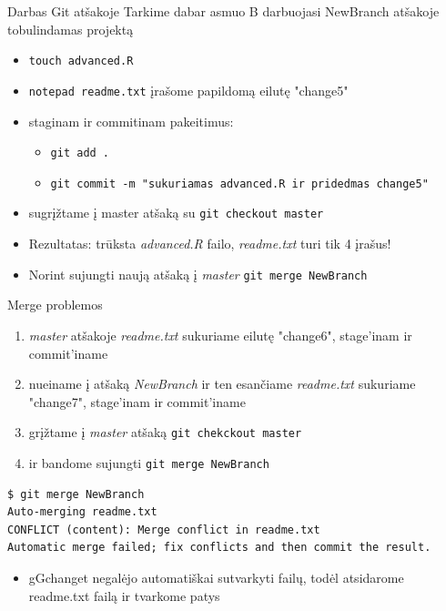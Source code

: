 \documentclass[11pt,xcolor=table]{beamer}
\begin{document}
\begin{frame}{Darbas Git atšakoje}
Tarkime dabar asmuo B darbuojasi NewBranch atšakoje tobulindamas projektą
\begin{itemize}
\item \colorbox{listinggray}{\lstinline|touch advanced.R|}
\item \colorbox{listinggray}{\lstinline|notepad readme.txt|} įrašome papildomą eilutę "change5"
\item staginam ir commitinam pakeitimus:
\begin{itemize}
\item \colorbox{listinggray}{\lstinline|git add .|}
\item \colorbox{listinggray}{\lstinline|git commit -m "sukuriamas advanced.R ir pridedmas change5"|}
\end{itemize}
\item sugrįžtame į master atšaką su \colorbox{listinggray}{\lstinline|git checkout master|}
\item Rezultatas: trūksta \textit{advanced.R} failo, \textit{readme.txt} turi tik 4 įrašus!
\item Norint sujungti naują atšaką į \textit{master} \colorbox{listinggray}{\lstinline|git merge NewBranch|}
\end{itemize}
\end{frame}

\begin{frame}[fragile]{Merge problemos}
\begin{enumerate}
\item \textit{master} atšakoje \textit{readme.txt} sukuriame eilutę "change6", stage'inam ir commit'iname 
\item nueiname į atšaką \textit{NewBranch} ir ten esančiame \textit{readme.txt} sukuriame "change7", stage'inam ir commit'iname 
\item grįžtame į \textit{master} atšaką \colorbox{listinggray}{\lstinline|git chekckout master|}
\item ir bandome sujungti \colorbox{listinggray}{\lstinline|git merge NewBranch|}
\end{enumerate}

\begin{lstlisting}
$ git merge NewBranch
Auto-merging readme.txt
CONFLICT (content): Merge conflict in readme.txt
Automatic merge failed; fix conflicts and then commit the result.
\end{lstlisting}
\begin{itemize}
\item gGchanget negalėjo automatiškai sutvarkyti failų, todėl atsidarome readme.txt failą ir tvarkome patys
\end{itemize}
\end{frame}
\end{document}
